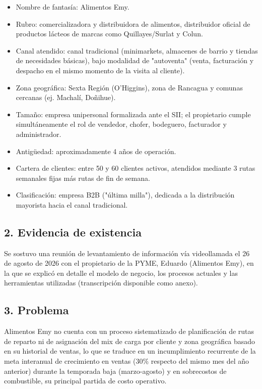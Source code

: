 \documentclass[10pt,a4paper]{article}
\begin{document}
\begin{itemize}[leftmargin=1.2cm]
    \item Nombre de fantasía: Alimentos Emy.
    \item Rubro: comercializadora y distribuidora de alimentos, distribuidor oficial de productos lácteos de marcas como Quillayes/Surlat y Colun.
    \item Canal atendido: canal tradicional (minimarkets, almacenes de barrio y tiendas de necesidades básicas), bajo modalidad de "autoventa" (venta, facturación y despacho en el mismo momento de la visita al cliente).
    \item Zona geográfica: Sexta Región (O'Higgins), zona de Rancagua y comunas cercanas (ej. Machalí, Doñihue).
    \item Tamaño: empresa unipersonal formalizada ante el SII; el propietario cumple simultáneamente el rol de vendedor, chofer, bodeguero, facturador y administrador.
    \item Antigüedad: aproximadamente 4 años de operación.
    \item Cartera de clientes: entre 50 y 60 clientes activos, atendidos mediante 3 rutas semanales fijas más rutas de fin de semana.
    \item Clasificación: empresa B2B ("última milla"), dedicada a la distribución mayorista hacia el canal tradicional.
\end{itemize}


\subsection*{2. Evidencia de existencia}

Se sostuvo una reunión de levantamiento de información vía videollamada el 26 de agosto de 2026 con el propietario de la PYME, Eduardo (Alimentos Emy), en la que se explicó en detalle el modelo de negocio, los procesos actuales y las herramientas utilizadas (transcripción disponible como anexo).

\subsection*{3. Problema}

Alimentos Emy no cuenta con un proceso sistematizado de planificación de rutas de reparto ni de asignación del mix de carga por cliente y zona geográfica basado en su historial de ventas, lo que se traduce en un incumplimiento recurrente de la meta interanual de crecimiento en ventas (30\% respecto del mismo mes del año anterior) durante la temporada baja (marzo-agosto) y en sobrecostos de combustible, su principal partida de costo operativo.
\end{document}
